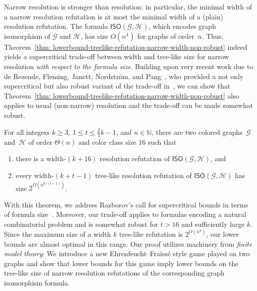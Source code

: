 \documentclass[a4paper,english, thm-restate]{lipics-v2021}
\newcommand{\nat}{\mathbb{N}}
\newcommand{\graphG}{\mathcal{G}}
\newcommand{\graphH}{\mathcal{H}}
\newcommand{\ISO}{\mathsf{ISO}(\graphG, \graphH)}
\begin{document}
\noindent Narrow resolution is stronger than resolution; in particular, the minimal width of a narrow resolution refutation is
at most the minimal width of a (plain) resolution refutation. The
formula $\ISO$, which encodes graph isomorphism of $\graphG$ and
$\graphH$, has size
%
%
$O(n^4)$
for graphs of order~$n$.
Thus, Theorem~\ref{thm: lowerbound-treelike-refutation-narrow-width-non-robust} indeed
yields a supercritical trade-off between width and tree-like size for narrow resolution \emph{with respect to the formula size}.
Building upon very recent work due to de Rezende, 
                   Fleming, Janett, Nordström, and Pang~\cite{RFJN024}, who provided a not only supercritical but also robust variant of the trade-off in~\cite{DBLP:conf/focs/GroheLNS23}, 
we can show that Theorem~\ref{thm: lowerbound-treelike-refutation-narrow-width-non-robust}
also applies to usual (non-narrow) resolution %
and
the trade-off can be made somewhat robust.

\begin{theorem}
        \label{thm: lowerbound-treelike-refutation-width}
        For all integers $k \geq 3$, $1\leq t \leq \frac{2}{5}k-1$, and $n \in \nat$, there are two colored graphs~$\graphG$ and~$\graphH$
        of order $\Theta(n)$ and color class size $16$
        such that 
        \begin{enumerate}
                \item \label{itm:resolution-refutable} there is a width-$(k+16)$ resolution refutation of $\ISO$, and
                \item \label{itm:resolution-robust} every width-$(k+t-1)$ tree-like resolution refutation of $\ISO$ has size $2^{\Omega(n^{k/(t+1)})}$.
        \end{enumerate}
\end{theorem}

\noindent
%
%
With this theorem, we address
Razborov's call for supercritical bounds in terms of formula size~\cite{DBLP:journals/jacm/Razborov16}. Moreover, our trade-off applies to formulas encoding a natural combinatorial problem and is somewhat robust for $t > 16$ and sufficiently large $k$. Since the maximum size of a width $k$ tree-like refutation is $2^{O(n^k)}$, our lower bounds are almost optimal in this range. Our proof utilizes machinery from \emph{finite model theory}:
%
We introduce a new Ehrenfeucht–Fraïssé style game played on two graphs 
and show that lower bounds for this game imply lower bounds
on the tree-like size of narrow resolution refutations
of the corresponding graph isomorphism formula. %
\end{document}
